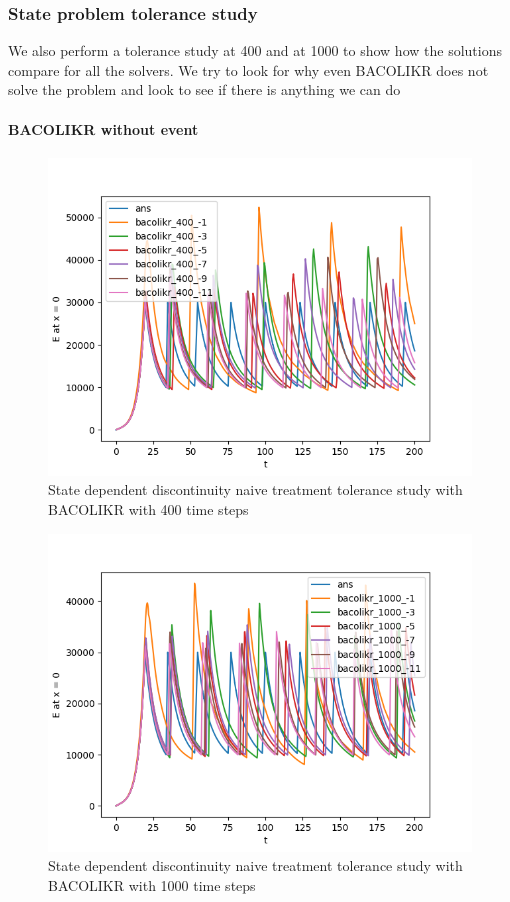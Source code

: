 \documentclass{article}
\begin{document}
\subsubsection{State problem tolerance study}
\label{subsubsection:pde_state_tol_study}
We also perform a tolerance study at 400 and at 1000 to show how the solutions compare for all the solvers. We try to look for why even BACOLIKR does not solve the problem and look to see if there is anything we can do

\paragraph{BACOLIKR without event}
\begin{figure}[H]
\centering
\includegraphics[width=0.7\linewidth]{./figures/pde_state_disc_tol_bacolikr_naive_400}
\caption{State dependent discontinuity naive treatment tolerance study with BACOLIKR with 400 time steps}
\label{fig:pde_state_disc_tol_bacolikr_naive_400}
\end{figure}

\begin{figure}[H]
\centering
\includegraphics[width=0.7\linewidth]{./figures/pde_state_disc_tol_bacolikr_naive_1000}
\caption{State dependent discontinuity naive treatment tolerance study with BACOLIKR with 1000 time steps}
\label{fig:pde_state_disc_tol_bacolikr_naive_1000}
\end{figure}
\end{document}
